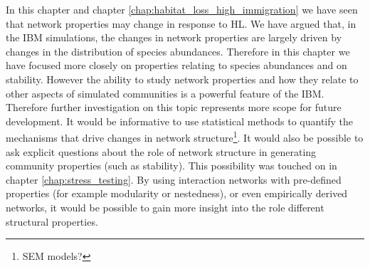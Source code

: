 In this chapter and chapter \ref{chap:habitat_loss_high_immigration} we have seen that network properties may change in response to HL. We have argued that, in the IBM simulations, the changes in network properties are largely driven by changes in the distribution of species abundances. Therefore in this chapter we have focused more closely on properties relating to species abundances and on stability. However the ability to study network properties and how they relate to other aspects of simulated communities is a powerful feature of the IBM. Therefore further investigation on this topic represents more scope for future development. It would be informative to use statistical methods to quantify the mechanisms that drive changes in network structure\footnote{SEM models?}. It would also be possible to ask explicit questions about the role of network structure in generating community properties (such as stability). This possibility was touched on in chapter \ref{chap:stress_testing}. By using interaction networks with pre-defined properties (for example modularity or nestedness), or even empirically derived networks, it would be possible to gain more insight into the role different structural properties. 

%
%

